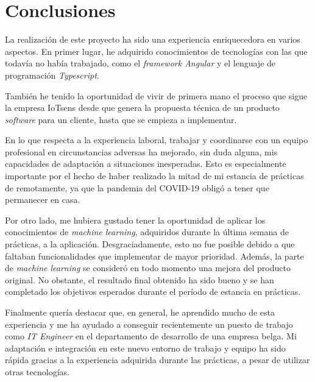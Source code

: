 \documentclass[pdftex,11pt,a4paper]{book}
\begin{document}
\chapter{Conclusiones} \label{capitulo:conclusiones}

La realización de este proyecto ha sido una experiencia enriquecedora en varios aspectos. En primer lugar, he adquirido conocimientos de tecnologías con las que todavía no había trabajado, como el \textit{framework Angular} y el lenguaje de programación \textit{Typescript}. 

También he tenido la oportunidad de vivir de primera mano el proceso que sigue la empresa IoTsens desde que genera la propuesta técnica de un producto \textit{software} para un cliente, hasta que se empieza a implementar.

En lo que respecta a la experiencia laboral, trabajar y coordinarse con un equipo profesional en circunstancias adversas ha mejorado, sin duda alguna, mis capacidades de adaptación a situaciones inesperadas. Esto es especialmente importante por el hecho de haber realizado la mitad de mi estancia de prácticas de remotamente, ya que la pandemia del COVID-19 obligó a tener que permanecer en casa.

Por otro lado, me hubiera gustado tener la oportunidad de aplicar los conocimientos de \textit{machine learning}, adquiridos durante la última semana de prácticas, a la aplicación. Desgraciadamente, esto no fue posible debido a que faltaban funcionalidades que implementar de mayor prioridad. Además, la parte de \textit{machine learning} se consideró en todo momento una mejora del producto original. No obstante, el resultado final obtenido ha sido bueno y se han completado los objetivos esperados durante el período de estancia en prácticas.

Finalmente quería destacar que, en general, he aprendido mucho de esta experiencia y me ha ayudado a conseguir recientemente un puesto de trabajo como \textit{IT Engineer} en el departamento de desarrollo de una empresa belga. Mi adaptación e integración en este nuevo entorno de trabajo y equipo ha sido rápida gracias a la experiencia adquirida durante las prácticas, a pesar de utilizar otras tecnologías.








%

\cleardoublepage
{}
{}


\end{document}
